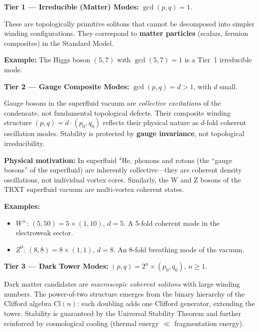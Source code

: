 \begin{mdframed}[backgroundcolor=green!5]
\textbf{Tier 1 --- Irreducible (Matter) Modes:} $\gcd(p,q) = 1$.

These are topologically primitive solitons that cannot be decomposed into simpler winding configurations.  They correspond to \textbf{matter particles} (scalars, fermion composites) in the Standard Model.
\end{mdframed}

\textbf{Example:} The Higgs boson $(5,7)$ with $\gcd(5,7) = 1$ is a Tier~1 irreducible mode.

\begin{mdframed}[backgroundcolor=yellow!10]
\textbf{Tier 2 --- Gauge Composite Modes:} $\gcd(p,q) = d > 1$, with $d$ small.

Gauge bosons in the superfluid vacuum are \emph{collective excitations} of the condensate, not fundamental topological defects.  Their composite winding structure $(p,q) = d \cdot (p_0, q_0)$ reflects their physical nature as $d$-fold coherent oscillation modes.  Stability is protected by \textbf{gauge invariance}, not topological irreducibility.
\end{mdframed}

\textbf{Physical motivation:} In superfluid $^4$He, phonons and rotons (the ``gauge bosons'' of the superfluid) are inherently collective---they are coherent density oscillations, not individual vortex cores.  Similarly, the W and Z bosons of the TRXT superfluid vacuum are multi-vortex coherent states.

\textbf{Examples:}
\begin{itemize}
    \item $W^\pm$: $(5,50) = 5 \times (1,10)$, $d = 5$.  A 5-fold coherent mode in the electroweak sector.
    \item $Z^0$: $(8,8) = 8 \times (1,1)$, $d = 8$.  An 8-fold breathing mode of the vacuum.
\end{itemize}

\begin{mdframed}[backgroundcolor=red!5]
\textbf{Tier 3 --- Dark Tower Modes:} $(p,q) = 2^n \times (p_0, q_0)$, $n \ge 1$.

Dark matter candidates are \emph{macroscopic coherent solitons} with large winding numbers.  The power-of-two structure emerges from the binary hierarchy of the Clifford algebra $\mathrm{Cl}(n)$: each doubling adds one Clifford generator, extending the tower.  Stability is guaranteed by the Universal Stability Theorem and further reinforced by cosmological cooling (thermal energy $\ll$ fragmentation energy).
\end{mdframed}

